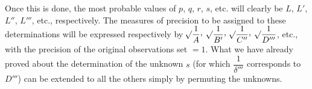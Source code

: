 Once this is done, the most probable values of $p$, $q$, $r$, $s$, etc. will clearly be $L$, $L'$, $L''$, $L'''$, etc., respectively. The measures of precision to be assigned to these determinations will be expressed respectively by
$\BareRoot{\dfrac{1}{A}}\mathpunct{\raisebox{.45ex}{,}}$
$\BareRoot{\dfrac{1}{B'}}\mathpunct{\raisebox{.45ex}{,}}$
$\BareRoot{\dfrac{1}{C''}}\mathpunct{\raisebox{.45ex}{,}}$
$\mathord{{}^{}\!\surd}\dfrac{1}{D'''}$, etc., with the precision of the original observations set $=1$. What we have already proved about the determination of the unknown $s$ (for which $\dfrac{1}{\delta'''}$ corresponds to $D'''$) can be extended to all the others simply by permuting the unknowns.%
